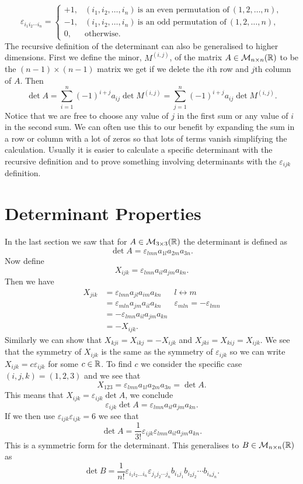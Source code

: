 \documentclass[a4paper]{article}
\newcommand{\nxmMatrices}[3]{\mathcal{M}_{{#1}\times{#2}}({#3})}
\newcommand{\swap}[2]{{#1} \leftrightarrow {#2}}
\begin{document}
    \[
        \varepsilon_{i_1i_2\dotsm i_n} =
        \begin{cases}
            +1, & (i_1, i_2, \dotsc, i_n)~\text{is an even permutation of}~(1, 2, \dotsc, n),\\
            -1, & (i_1, i_2, \dotsc, i_n)~\text{is an odd permutation of}~(1, 2, \dotsc, n),\\
            0, & \text{otherwise}.
        \end{cases}
    \]
    The recursive definition of the determinant can also be generalised to higher dimensions.
    First we define the minor, \(M^{(i, j)}\), of the matrix \(A\in\nxmMatrices{n}{n}{\reals}\) to be the \((n-1)\times(n-1)\) matrix we get if we delete the \(i\)th row and \(j\)th column of \(A\).
    Then
    \[\det A = \sum_{i=1}^n (-1)^{i + j}a_{ij}\det M^{(i, j)} = \sum_{j=1}^{n} (-1)^{i+j} a_{ij}\det M^{(i, j)}.\]
    Notice that we are free to choose any value of \(j\) in the first sum or any value of \(i\) in the second sum.
    We can often use this to our benefit by expanding the sum in a row or column with a lot of zeros so that lots of terms vanish simplifying the calculation.
    Usually it is easier to calculate a specific determinant with the recursive definition and to prove something involving determinants with the \(\varepsilon_{ijk}\) definition.
    
    \section{Determinant Properties}
    In the last section we saw that for \(A\in\nxmMatrices{3}{3}{\reals}\) the determinant is defined as
    \[\det A = \varepsilon_{lmn}a_{1l}a_{2m}a_{3n}.\]
    Now define
    \[X_{ijk} = \varepsilon_{lmn}a_{il}a_{jm}a_{kn}.\]
    Then we have
    \begin{align*}
        X_{jik} &= \varepsilon_{lmn}a_{jl}a_{im}a_{kn} & \swap{l}{m}\\
        &= \varepsilon_{mln}a_{jm}a_{il}a_{kn} & \varepsilon_{mln} = -\varepsilon_{lmn}\\
        &= -\varepsilon_{lmn}a_{il}a_{jm}a_{kn}\\
        &= -X_{ijk}.
    \end{align*}
    Similarly we can show that \(X_{kji} = X_{ikj} = -X_{ijk}\) and \(X_{jki} = X_{kij} = X_{ijk}\).
    We see that the symmetry of \(X_{ijk}\) is the same as the symmetry of \(\varepsilon_{ijk}\) so we can write \(X_{ijk} = c\varepsilon_{ijk}\) for some \(c\in\mathbb{R}\).
    To find \(c\) we consider the specific case \((i, j, k) = (1, 2, 3)\) and we see that
    \[X_{123} = \varepsilon_{lmn}a_{1l}a_{2m}a_{3n} = \det A.\]
    This means that \(X_{ijk} = \varepsilon_{ijk}\det A\), we conclude
    \[\varepsilon_{ijk}\det A = \varepsilon_{lmn}a_{il}a_{jm}a_{kn}.\]
    If we then use \(\varepsilon_{ijk}\varepsilon_{ijk} = 6\) we see that
    \[\det A = \frac{1}{3!}\varepsilon_{ijk}\varepsilon_{lmn}a_{il}a_{jm}a_{kn}.\]
    This is a symmetric form for the determinant.
    This generalises to \(B\in\nxmMatrices{n}{n}{\reals}\) as
    \[\det B = \frac{1}{n!}\varepsilon_{i_1i_2\dots i_n}\varepsilon_{j_1j_2\dotsm j_n}b_{i_1j_1}b_{i_2j_2}\dotsm b_{i_nj_n}.\]
    
\end{document}
